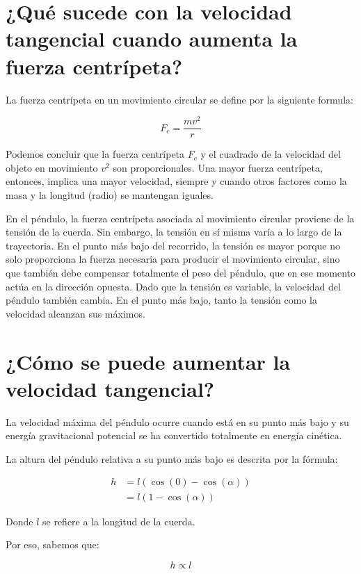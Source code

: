 \documentclass[letterpaper]{report}
\numberwithin{table}{section}
\begin{document}
\section*{¿Qué sucede con la velocidad tangencial cuando
aumenta la fuerza centrípeta?}\label{sec:velocidad_tangencial}

La fuerza centrípeta en un movimiento circular se define por la
siguiente formula:

\begin{equation}
  F_{c} = \frac{mv^{2}}{r}
\end{equation}

Podemos concluir que la fuerza centrípeta $F_{c}$ y el cuadrado de la
velocidad del objeto en movimiento $v^{2}$ son proporcionales. Una
mayor fuerza centrípeta, entonces, implica una mayor velocidad,
siempre y cuando otros factores como la masa y la longitud (radio) se
mantengan iguales.

En el péndulo, la fuerza centrípeta asociada al movimiento circular
proviene de la tensión de la cuerda. Sin embargo, la tensión en sí
misma varía a lo largo de la trayectoria. En el punto más bajo del
recorrido, la tensión es mayor porque no solo proporciona la fuerza
necesaria para producir el movimiento circular, sino que también debe
compensar totalmente el peso del péndulo, que en ese momento actúa en
la dirección opuesta. Dado que la tensión es variable, la velocidad
del péndulo también cambia. En el punto más bajo, tanto la tensión
como la velocidad alcanzan sus máximos.

\section*{¿Cómo se puede aumentar la velocidad tangencial?}

La velocidad máxima del péndulo ocurre cuando está en su punto más
bajo y su energía gravitacional potencial se ha convertido totalmente
en energía cinética.

La altura del péndulo relativa a su punto más bajo es descrita por la fórmula:

\begin{align}
  h &= l(\cos(0) - \cos(\alpha)) \nonumber \\
  &= l(1 - \cos(\alpha))
\end{align}

Donde $l$ se refiere a la longitud de la cuerda.

Por eso, sabemos que:

\begin{equation}
  h \propto l
\end{equation}
\end{document}
